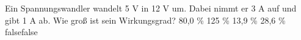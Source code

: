     {Ein Spannungswandler wandelt 5 V in 12 V um. Dabei nimmt er 3 A auf und gibt 1 A ab. Wie groß ist sein Wirkungsgrad?}
    {80,0 \%}
    {125 \%}
    {13,9 \%}
    {28,6 \%}
    {false}{false}